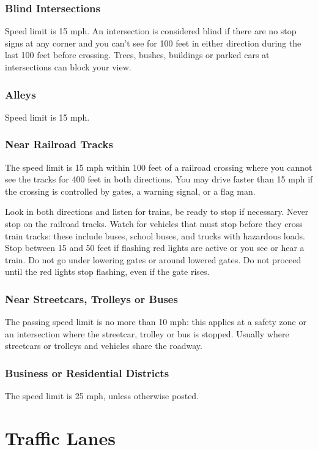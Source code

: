 \subsubsection{Blind Intersections}
Speed limit is 15 mph.
An intersection is considered blind if there are no stop signs at any corner
and you can't see for 100 feet in either direction
during the last 100 feet before crossing.
Trees, bushes, buildings or parked cars at intersections can block your view.

\subsubsection{Alleys}
Speed limit is 15 mph.

\subsubsection{Near Railroad Tracks}
The speed limit is 15 mph within 100 feet of a railroad crossing
where you cannot see the tracks for 400 feet in both directions.
You may drive faster than 15 mph if the crossing is controlled by gates,
a warning signal, or a flag man.

Look in both directions and listen for trains, be ready to stop if necessary.
Never stop on the railroad tracks.
Watch for vehicles that must stop before they cross train tracks: these include
buses, school buses, and trucks with hazardous loads.
Stop between 15 and 50 feet if flashing red lights are active
or you see or hear a train.
Do not go under lowering gates or around lowered gates.
Do not proceed until the red lights stop flashing, even if the gate rises.

\subsubsection{Near Streetcars, Trolleys or Buses}
The passing speed limit is no more than 10 mph:
this applies at a safety zone or an intersection where the
streetcar, trolley or bus is stopped.
Usually where streetcars or trolleys and vehicles share the roadway.

\subsubsection{Business or Residential Districts}
The speed limit is 25 mph, unless otherwise posted.


\section{Traffic Lanes}

